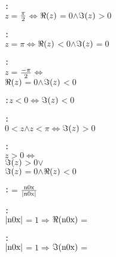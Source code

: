 \begin{alltt}
  : 
    \pvsid{(}\(z\)\pvsid{)} \(=\) \(\opdividetwofn{\pi}{2}\) \(\Leftrightarrow\) \pvsid{(}\(\Reonefn{z}\) \(=\) \(0\) \(\wedge\) \(\Imonefn{z}\) \(>\) \(0\)\pvsid{)}\vspace*{\pvsdeclspacing}

  : 
    \pvsid{(}\(z\)\pvsid{)} \(=\) \(\pi\) \(\Leftrightarrow\) \pvsid{(}\(\Reonefn{z}\) \(<\) \(0\) \(\wedge\) \(\Imonefn{z}\) \(=\) \(0\)\pvsid{)}\vspace*{\pvsdeclspacing}

  : 
    \pvsid{(}\(z\)\pvsid{)} \(=\) \(\opdividetwofn{\opdifferenceonefn{\pi}}{2}\) \(\Leftrightarrow\)
     \pvsid{(}\(\Reonefn{z}\) \(=\) \(0\) \(\wedge\) \(\Imonefn{z}\) \(<\) \(0\)\pvsid{)}\vspace*{\pvsdeclspacing}

  :  \pvsid{(}\(z\)\pvsid{)} \(<\) \(0\) \(\Leftrightarrow\) \(\Imonefn{z}\) \(<\) \(0\)\vspace*{\pvsdeclspacing}

  : 
    \pvsid{(}\(0\) \(<\) \pvsid{(}\(z\)\pvsid{)} \(\wedge\) \pvsid{(}\(z\)\pvsid{)} \(<\) \(\pi\)\pvsid{)} \(\Leftrightarrow\) \(\Imonefn{z}\) \(>\) \(0\)\vspace*{\pvsdeclspacing}

  : 
    \pvsid{(}\(z\)\pvsid{)} \(>\) \(0\) \(\Leftrightarrow\)
     \pvsid{(}\(\Imonefn{z}\) \(>\) \(0\) \(\vee\)
        \pvsid{(}\(\Imonefn{z}\) \(=\) \(0\) \(\wedge\) \(\Reonefn{z}\) \(<\) \(0\)\pvsid{)}\pvsid{)}\vspace*{\pvsdeclspacing}

  :  \pvsid{(}\pvsid{)} \(=\) \pvsid{(}\(\opdividetwofn{\pvsid{n0x}}{\absonefn{\pvsid{n0x}}}\)\pvsid{)}\vspace*{\pvsdeclspacing}

  : 
    \(\absonefn{\pvsid{n0x}}\) \(=\) \(1\) \(\Rightarrow\) \(\Reonefn{\pvsid{n0x}}\) \(=\) \pvsid{(}\pvsid{(}\pvsid{)}\pvsid{)}\vspace*{\pvsdeclspacing}

  : 
    \(\absonefn{\pvsid{n0x}}\) \(=\) \(1\) \(\Rightarrow\) \(\Imonefn{\pvsid{n0x}}\) \(=\) \pvsid{(}\pvsid{(}\pvsid{)}\pvsid{)}\vspace*{\pvsdeclspacing}


\end{alltt}
